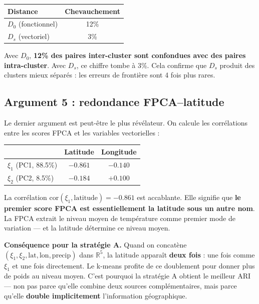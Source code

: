 \documentclass[11pt, a4paper]{article}
\newcommand{\R}{\mathbb{R}}
\theoremstyle{definition}
\theoremstyle{remark}
\begin{document}
\begin{center}
\begin{tabular}{lc}
  \toprule
  \textbf{Distance} & \textbf{Chevauchement} \\
  \midrule
  $D_0$ (fonctionnel) & 12\% \\
  $D_s$ (vectoriel)   & 3\%  \\
  \bottomrule
\end{tabular}
\end{center}

Avec $D_0$, \textbf{12\% des paires inter-cluster sont confondues avec des
paires intra-cluster}. Avec $D_s$, ce chiffre tombe à 3\%. Cela confirme que
$D_s$ produit des clusters mieux séparés : les erreurs de frontière sont 4
fois plus rares.

\subsection{Argument 5 : redondance FPCA–latitude}

Le dernier argument est peut-être le plus révélateur. On calcule les
corrélations entre les scores FPCA et les variables vectorielles :

\begin{center}
\begin{tabular}{lcc}
  \toprule
  & \textbf{Latitude} & \textbf{Longitude} \\
  \midrule
  $\xi_1$ (PC1, 88.5\%) & $-0.861$ & $-0.140$ \\
  $\xi_2$ (PC2, 8.5\%)  & $-0.184$ & $+0.100$ \\
  \bottomrule
\end{tabular}
\end{center}

La corrélation $\text{cor}(\xi_1, \text{latitude}) = -0.861$ est accablante.
Elle signifie que \textbf{le premier score FPCA est essentiellement la latitude
sous un autre nom}. La FPCA extrait le niveau moyen de température comme
premier mode de variation — et la latitude détermine ce niveau moyen.

\textbf{Conséquence pour la stratégie A.} Quand on concatène
$(\xi_1, \xi_2, \text{lat}, \text{lon}, \text{precip})$ dans $\R^5$, la
latitude apparaît \textbf{deux fois} : une fois comme $\xi_1$ et une fois
directement. Le k-means profite de ce doublement pour donner plus de poids
au niveau moyen. C'est pourquoi la stratégie A obtient le meilleur ARI
— non pas parce qu'elle combine deux sources complémentaires, mais parce
qu'elle \textbf{double implicitement} l'information géographique.
\end{document}
